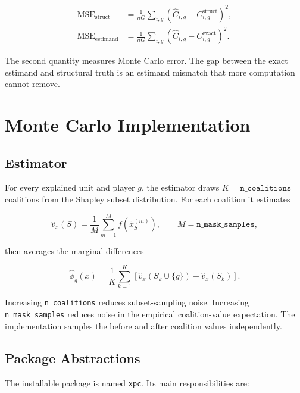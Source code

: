 \documentclass[11pt]{article}
\newcommand{\code}[1]{\texttt{#1}}
\newcommand{\MSE}{\operatorname{MSE}}
\begin{document}
\begin{align}
\MSE_{\mathrm{struct}}
  &=\frac{1}{nG}\sum_{i,g}
    \left(\widehat C_{i,g}-C^{\mathrm{struct}}_{i,g}\right)^2,\\
\MSE_{\mathrm{estimand}}
  &=\frac{1}{nG}\sum_{i,g}
    \left(\widehat C_{i,g}-C^{\mathrm{exact}}_{i,g}\right)^2.
\end{align}

The second quantity measures Monte Carlo error.  The gap between the exact
estimand and structural truth is an estimand mismatch that more computation
cannot remove.

\section{Monte Carlo Implementation}

\subsection{Estimator}

For every explained unit and player \(g\), the estimator draws
\(K=\code{n\_coalitions}\) coalitions from the Shapley subset distribution.
For each coalition it estimates

\begin{equation}
\widehat v_x(S)=\frac{1}{M}\sum_{m=1}^{M}
f\!\left(\widetilde x_S^{(m)}\right),
\qquad M=\code{n\_mask\_samples},
\end{equation}

then averages the marginal differences

\begin{equation}
\widehat\phi_g(x)=\frac{1}{K}\sum_{k=1}^{K}
\left[\widehat v_x(S_k\cup\{g\})-\widehat v_x(S_k)\right].
\end{equation}

Increasing \code{n\_coalitions} reduces subset-sampling noise.  Increasing
\code{n\_mask\_samples} reduces noise in the empirical coalition-value
expectation.  The implementation samples the before and after coalition values
independently.

\subsection{Package Abstractions}

The installable package is named \code{xpc}.  Its main responsibilities are:
\end{document}
